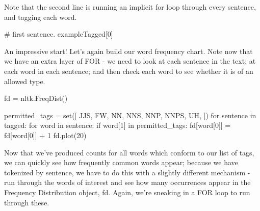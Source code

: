 \documentclass[
  letterpaper,
  DIV=11,
  numbers=noendperiod]{scrreprt}
\newenvironment{Shaded}{\begin{snugshade}}{\end{snugshade}}
\newcommand{\BuiltInTok}[1]{\textcolor[rgb]{0.00,0.23,0.31}{#1}}
\newcommand{\CommentTok}[1]{\textcolor[rgb]{0.37,0.37,0.37}{#1}}
\newcommand{\ControlFlowTok}[1]{\textcolor[rgb]{0.00,0.23,0.31}{#1}}
\newcommand{\DecValTok}[1]{\textcolor[rgb]{0.68,0.00,0.00}{#1}}
\newcommand{\KeywordTok}[1]{\textcolor[rgb]{0.00,0.23,0.31}{#1}}
\newcommand{\NormalTok}[1]{\textcolor[rgb]{0.00,0.23,0.31}{#1}}
\newcommand{\OperatorTok}[1]{\textcolor[rgb]{0.37,0.37,0.37}{#1}}
\newcommand{\StringTok}[1]{\textcolor[rgb]{0.13,0.47,0.30}{#1}}
\begin{document}
Note that the second line is running an implicit for loop through every
sentence, and tagging each word.

\begin{Shaded}
\begin{Highlighting}[]
\CommentTok{\# first sentence.}
\NormalTok{exampleTagged[}\DecValTok{0}\NormalTok{]}
\end{Highlighting}
\end{Shaded}

An impressive start! Let's again build our word frequency chart. Note
now that we have an extra layer of FOR - we need to look at each
sentence in the text; at each word in each sentence; and then check each
word to see whether it is of an allowed type.

\begin{Shaded}
\begin{Highlighting}[]
\NormalTok{fd }\OperatorTok{=}\NormalTok{ nltk.FreqDist()}

\NormalTok{permitted\_tags }\OperatorTok{=} \BuiltInTok{set}\NormalTok{([}
    \StringTok{\textquotesingle{}JJS\textquotesingle{}}\NormalTok{,}
    \StringTok{\textquotesingle{}FW\textquotesingle{}}\NormalTok{,}
    \StringTok{\textquotesingle{}NN\textquotesingle{}}\NormalTok{,}
    \StringTok{\textquotesingle{}NNS\textquotesingle{}}\NormalTok{,}
    \StringTok{\textquotesingle{}NNP\textquotesingle{}}\NormalTok{,}
    \StringTok{\textquotesingle{}NNPS\textquotesingle{}}\NormalTok{,}
    \StringTok{\textquotesingle{}UH\textquotesingle{}}\NormalTok{,}
\NormalTok{])}
\ControlFlowTok{for}\NormalTok{ sentence }\KeywordTok{in}\NormalTok{ tagged:}
    \ControlFlowTok{for}\NormalTok{ word }\KeywordTok{in}\NormalTok{ sentence:}
        \ControlFlowTok{if}\NormalTok{ word[}\DecValTok{1}\NormalTok{] }\KeywordTok{in}\NormalTok{ permitted\_tags:}
\NormalTok{                fd[word[}\DecValTok{0}\NormalTok{]] }\OperatorTok{=}\NormalTok{ fd[word[}\DecValTok{0}\NormalTok{]] }\OperatorTok{+} \DecValTok{1}
\NormalTok{fd.plot(}\DecValTok{20}\NormalTok{)}
\end{Highlighting}
\end{Shaded}

Now that we've produced counts for all words which conform to our list
of tags, we can quickly see how frequently common words appear; because
we have tokenized by sentence, we have to do this with a slightly
different mechanism - run through the words of interest and see how many
occurrences appear in the Frequency Distribution object, fd. Again,
we're sneaking in a FOR loop to run through these.
\end{document}
